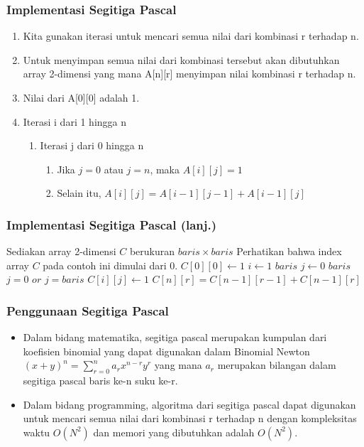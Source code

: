 \begin{frame}
\frametitle{Implementasi Segitiga Pascal}
\begin{enumerate}
  \item Kita gunakan iterasi untuk mencari semua nilai dari kombinasi r terhadap n.
  \item Untuk menyimpan semua nilai dari kombinasi tersebut akan dibutuhkan array 2-dimensi yang mana A[n][r] menyimpan nilai kombinasi r terhadap n.
  \item Nilai dari A[0][0] adalah 1.
  \item Iterasi i dari 1 hingga n
  \begin{enumerate}
    \item Iterasi j dari 0 hingga n
    \begin{enumerate}
      \item Jika $j = 0$ atau $j = n$, maka $A[i][j] = 1$
      \item Selain itu, $A[i][j] = A[i-1][j-1] + A[i-1][j]$
    \end{enumerate}
  \end{enumerate}
\end{enumerate}
\end{frame}

\begin{frame}[fragile]
\frametitle{Implementasi Segitiga Pascal (lanj.)}
\begin{codebox}
\li \Comment Sediakan array 2-dimensi $C$ berukuran $baris \times baris$
\li \Comment Perhatikan bahwa index array $C$ pada contoh ini dimulai dari 0.
\li $C[0][0] \gets 1$
\li \For $i \gets 1$ \To $baris$
    \Do
\li   \For $j \gets 0$ \To $baris$
      \Do
\li     \If $j = 0$ $or$ $j = baris$
        \Then
\li       $C[i][j] \gets 1$
\li     \Else
\li       $C[n][r] = C[n-1][r-1] + C[n-1][r]$
        \End
      \End
    \End
\end{codebox}
\end{frame}

\begin{frame}
\frametitle{Penggunaan Segitiga Pascal}
\begin{itemize}
  \item Dalam bidang matematika, segitiga pascal merupakan kumpulan dari koefisien binomial yang dapat digunakan dalam Binomial Newton $(x+y)^{n} = \sum\limits_{r=0}^{n} a_{r} x^{n-r} y^{r}$ yang mana $a_{r}$ merupakan bilangan dalam segitiga pascal baris ke-n suku ke-r.
  \item Dalam bidang programming, algoritma dari segitiga pascal dapat digunakan untuk mencari semua nilai dari kombinasi r terhadap n dengan kompleksitas waktu $O(N^{2})$ dan memori yang dibutuhkan adalah $O(N^{2})$.
\end{itemize}
\end{frame}

